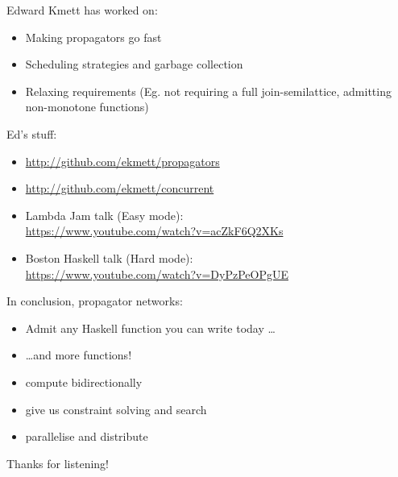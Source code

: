 \documentclass[usenames,dvipsnames,svgnames,table,aspectratio=1610,mathserif]{beamer}
\newcommand{\textslide}[1]{{
\begin{frame}
\begin{center}

#1

\end{center}
\end{frame}
}}
\newcommand{\textslideleft}[1]{{
\begin{frame}

#1

\end{frame}
}}
\begin{document}
\textslideleft{
Edward Kmett has worked on:

\begin{itemize}
\item Making propagators go fast
\item Scheduling strategies and garbage collection
\item Relaxing requirements (Eg. not requiring a full join-semilattice, admitting non-monotone functions)
\end{itemize}

Ed's stuff:
\begin{itemize}
\item \url{http://github.com/ekmett/propagators}
\item \url{http://github.com/ekmett/concurrent}
\item Lambda Jam talk (Easy mode): \\
      \url{https://www.youtube.com/watch?v=acZkF6Q2XKs}
\item Boston Haskell talk (Hard mode): \\
      \url{https://www.youtube.com/watch?v=DyPzPeOPgUE}

\end{itemize}
}

\textslideleft{

In conclusion, propagator networks:

\begin{itemize}
\item Admit any Haskell function you can write today \ldots
\item \ldots and more functions!
\item compute bidirectionally
\item give us constraint solving and search
\item parallelise and distribute
\end{itemize}
}


\textslide{\Large{Thanks for listening!}}
\end{document}
